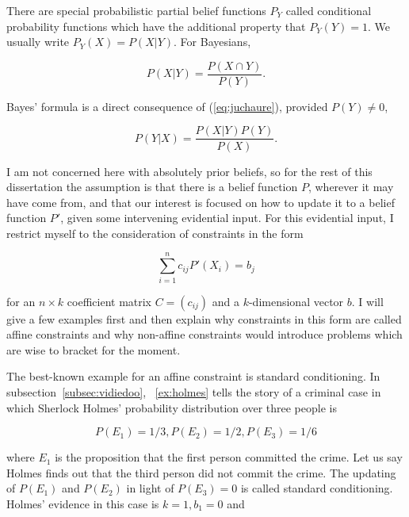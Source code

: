 \documentclass[phd,12pt,oneside]{ubcthesis}
\begin{document}
There are special probabilistic partial belief functions $P_{Y}$
called conditional probability functions which have the additional property
that $P_{Y}(Y)=1$. We usually write $P_{Y}(X)=P(X|Y)$. For Bayesians,

\begin{equation}
  \label{eq:juchaure}
  P(X|Y)=\frac{P(X\cap{}Y)}{P(Y)}.
\end{equation}

{\noindent}Bayes' formula is a direct consequence of
(\ref{eq:juchaure}), provided $P(Y)\neq{}0$,

\begin{equation}
  \label{eq:aegoopei}
  P(Y|X)=\frac{P(X|Y)P(Y)}{P(X)}.
\end{equation}

{\noindent}I am not concerned here with absolutely prior beliefs, so for the rest
of this dissertation the assumption is that there is a belief function
$P$, wherever it may have come from, and that our interest is focused
on how to update it to a belief function $P'$, given some intervening
evidential input. For this evidential input, I restrict myself to
the consideration of constraints in the form 

\begin{equation}
  \label{eq:ahghaega}
  \sum_{i=1}^{n}c_{ij}P'(X_{i})=b_{j}
\end{equation}

{\noindent}for an $n\times{}k$ coefficient matrix $C=(c_{ij})$ and a
$k$-dimensional vector $b$. I will give a few examples first and then
explain why constraints in this form are called affine constraints and
why non-affine constraints would introduce problems which are wise to
bracket for the moment.

The best-known example for an affine constraint is standard
conditioning. In subsection~\ref{subsec:vidiedoo},
{\xample}~\ref{ex:holmes} tells the story of a criminal case in which
Sherlock Holmes' probability distribution over three people is

\begin{equation}
  \label{eq:aelioshi}
P(E_{1})=1/3,P(E_{2})=1/2,P(E_{3})=1/6
\end{equation}

{\noindent}where $E_{1}$ is the proposition that the first person
committed the crime. Let us say Holmes finds out that the third person
did not commit the crime. The updating of $P(E_{1})$ and $P(E_{2})$ in
light of $P(E_{3})=0$ is called standard conditioning. Holmes'
evidence in this case is $k=1,b_{1}=0$ and
\end{document}
